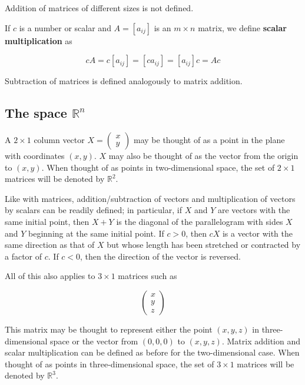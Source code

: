 \documentclass[12pt,a4paper,oneside]{book}
\theoremstyle{definition}
\theoremstyle{plain}
\begin{document}
Addition of matrices of different sizes is not defined.

If $c$ is a number or scalar and $A = [a_{ij}]$ is an $m \times n$ matrix, we define \textbf{scalar multiplication} as

\begin{equation}
cA = c[a_{ij}] = [ca_{ij}] = [a_{ij}]c = Ac
\end{equation}

Subtraction of matrices is defined analogously to matrix addition.

\subsection{The space $\mathbb{R}^n$}

A $2 \times 1$ column vector $X = \begin{pmatrix} x \\ y\end{pmatrix}$ may be thought of as a point in the plane with coordinates $(x, y)$. $X$ may also be thought of as the vector from the origin to $(x, y)$. When thought of as points in two-dimensional space, the set of $2 \times 1$ matrices will be denoted by $\mathbb{R}^2$.

Like with matrices, addition/subtraction of vectors and multiplication of vectors by scalars can be readily defined; in particular, if $X$ and $Y$ are vectors with the same initial point, then $X + Y$ is the diagonal
of the parallelogram with sides $X$ and $Y$ beginning at the same initial point. If $c > 0$, then $cX$ is a vector with the same direction as that of $X$ but whose length has been stretched or contracted by a factor of $c$. If $c < 0$, then the direction of the vector is reversed.

All of this also applies to $3 \times 1$ matrices such as 

\begin{equation*}
\begin{pmatrix} x \\ y \\ z\end{pmatrix}
\end{equation*}

This matrix may be thought to represent either the point $(x,y,z)$ in three-dimensional space or the vector from
$(0,0,0)$ to $(x,y,z)$. Matrix addition and scalar multiplication can be defined as before for the two-dimensional case. When thought of as points in three-dimensional space, the set of $3 \times 1$ matrices will be denoted by $\mathbb{R}^3$.
\end{document}
